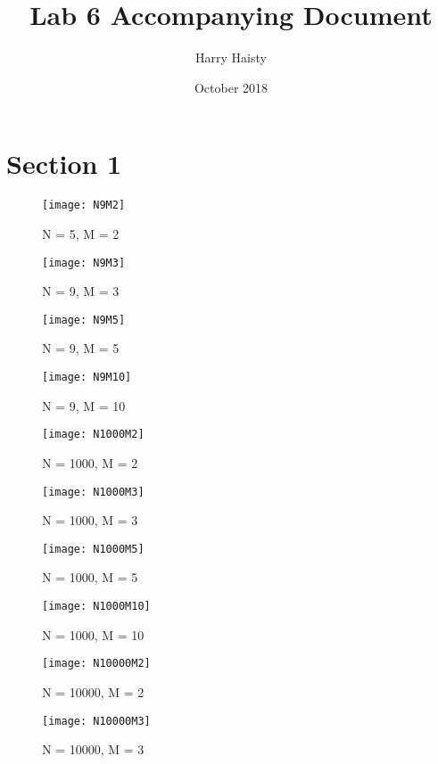 \documentclass{article}
\title{Lab 6 Accompanying Document}
\author{Harry Haisty}
\date{October 2018}
\begin{document}
\maketitle

\section*{Section 1}
\begin{figure}[h]
    \centering
    \texttt{[image: N9M2]}
    \caption{N = 5, M = 2}
\end{figure}

\begin{figure}[h]
    \centering
    \texttt{[image: N9M3]}
    \caption{N = 9, M = 3}
\end{figure}

\begin{figure}[h]
    \centering
    \texttt{[image: N9M5]}
    \caption{N = 9, M = 5}
\end{figure}

\begin{figure}[h]
    \centering
    \texttt{[image: N9M10]}
    \caption{N = 9, M = 10}
\end{figure}

\begin{figure}[h]
    \centering
    \texttt{[image: N1000M2]}
    \caption{N = 1000, M = 2}
\end{figure}

\begin{figure}[h]
    \centering
    \texttt{[image: N1000M3]}
    \caption{N = 1000, M = 3}
\end{figure}

\begin{figure}[h]
    \centering
    \texttt{[image: N1000M5]}
    \caption{N = 1000, M = 5}
\end{figure}

\begin{figure}[h]
    \centering
    \texttt{[image: N1000M10]}
    \caption{N = 1000, M = 10}
\end{figure}

\begin{figure}[h]
    \centering
    \texttt{[image: N10000M2]}
    \caption{N = 10000, M = 2}
\end{figure}

\begin{figure}[h]
    \centering
    \texttt{[image: N10000M3]}
    \caption{N = 10000, M = 3}
\end{figure}
\end{document}
